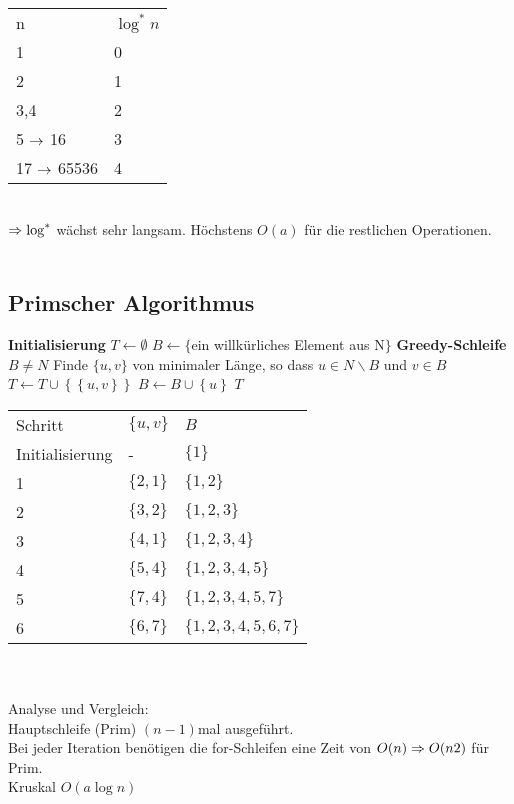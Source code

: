 \documentclass[a4paper,twoside,DIV15,BCOR12mm]{scrbook}
\begin{document}
\begin{tabular}{ll}
n								& $\log^{\ast}n$\\
1								& 0\\
2								& 1\\
3,4							& 2\\
5 $\rightarrow$ 16			& 3\\
17 $\rightarrow$ 65536 &	 4\\
\end{tabular}\\

$\Rightarrow \log^{\ast}$ wächst sehr langsam. Höchstens $O(a)$ für die restlichen Operationen.\\ \\

\subsection{Primscher Algorithmus}
\begin{codebox}
\zi \textbf{Initialisierung}
\li $T \gets \emptyset$
\li $B \gets \{$ein willkürliches Element aus N$\}$
\zi \textbf{Greedy-Schleife}
\li \While $B \neq N$
\li     \Do
            Finde $\{u,v\}$ von minimaler Länge, so dass $u\in N\backslash B$ und $v \in B$
\li         $T \gets T \cup \left\{\left\{u,v\right\} \right\}$
\li         $B \gets B \cup \left\{u\right\}$
        \End
\li \Return $T$
\end{codebox}


\begin{tabular}{lll}
Schritt 				& $\{u,v\}$ & $B$ \\
Initialisierung & - 				& $\{1\}$ \\
1 							& $\{2,1\}$ & $\{1,2\}$ \\
2 							& $\{3,2\}$ & $\{1,2,3\}$ \\
3 							& $\{4,1\}$ & $\{1,2,3,4\}$ \\
4 							& $\{5,4\}$ & $\{1,2,3,4,5\}$ \\
5 							& $\{7,4\}$ & $\{1,2,3,4,5,7\}$ \\
6 							& $\{6,7\}$ & $\{1,2,3,4,5,6,7\}$ \\
\end{tabular} \\ \\

Analyse und Vergleich:\\
Hauptschleife (Prim) $(n-1)$mal ausgeführt.\\
Bei jeder Iteration benötigen die for-Schleifen eine Zeit von $O(n) \Rightarrow O(n2)$ für Prim.\\
Kruskal $O(a \log{n})$
\end{document}

